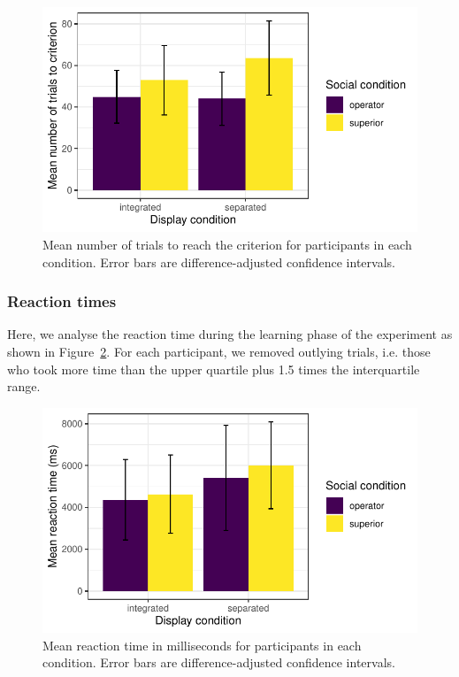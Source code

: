 \documentclass[doc, a4paper, apacite]{apa6}
\begin{document}
\begin{figure}
	\centering
	\includegraphics{images/DSTL07trialsCriterion}
	\caption{Mean number of trials to reach the criterion for participants in each condition. Error bars are difference-adjusted confidence intervals.}
	\label{fig:DSTL07trialsCriterion}
\end{figure}


\subsubsection{Reaction times}
Here, we analyse the reaction time during the learning phase of the experiment as shown in Figure~\ref{fig:DSTL07learningRT}. 
For each participant, we removed outlying trials, i.e. those who took more time than the upper quartile plus 1.5 times the interquartile range. 



\begin{figure}
	\centering
	\includegraphics{images/DSTL07learningRT}
	\caption{Mean reaction time in milliseconds for participants in each condition. Error bars are difference-adjusted confidence intervals.}
	\label{fig:DSTL07learningRT}
\end{figure}

\clearpage
\newpage


\end{document}
